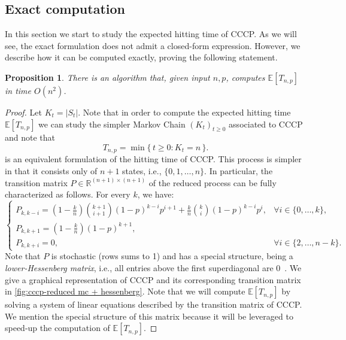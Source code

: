 \documentclass[11pt,a4paper]{article}
\newtheorem{proposition}[theorem]{Proposition}
\newcommand{\E}{\mathbb{E}}
\begin{document}
\subsection{Exact computation}\label{sec:algorithm}
In this section we start to study the expected hitting time of CCCP. As we will see, the exact formulation does not admit a closed-form expression. 
However, we describe how it can be computed exactly, proving the following statement.
\begin{proposition}
There is an algorithm that, given input $n,p$, computes $\E[T_{n,p}]$ in time $O(n^2)$.
\end{proposition}
\begin{proof}
Let $K_t = |S_t|$. Note that in order to compute the expected hitting time $\E[T_{n,p}]$ we can study the simpler Markov Chain $(K_t)_{t\ge 0}$ associated to CCCP and note that
\[
    T_{n,p} = \min\{\, t\ge 0 : K_t = n \,\}.
\]
is an equivalent formulation of the hitting time of CCCP.
This process is simpler in that it consists only of $n+1$ states, i.e., $\{0,1,\ldots,n\}$.
In particular, the transition matrix $P \in \mathbb{R}^{(n+1) \times (n+1)}$ of the reduced process can be fully characterized as follows. 
For every $k$, we have:
\[
\begin{cases}
    P_{k,k-i} = \left(1-\frac{k}{n}\right)\binom{k+1}{i+1}(1-p)^{k-i}p^{i+1} + \frac{k}{n} \binom{k}{i}(1-p)^{k-i}p^i, & \forall i \in \{0,\ldots,k\},
    \\
    P_{k,k+1} = \left(1-\frac{k}{n}\right)(1-p)^{k+1},&\\
    P_{k,k+i} = 0, & \forall i \in \{2,\ldots,n-k\}.
\end{cases}
\]
Note that $P$ is stochastic (rows sums to 1) and has a special structure, being a \textit{lower-Hessenberg matrix}, i.e., all entries above the first superdiagonal are 0~\cite{golub2013matrix}. 
We give a graphical representation of CCCP and its corresponding transition matrix in \cref{fig:cccp-reduced mc + hessenberg}. Note that we will compute $\E[T_{n,p}]$ by solving a system of linear equations described by the transition matrix of CCCP. We mention the special structure of this matrix because it will be leveraged to speed-up the computation of $\E[T_{n,p}]$.


\end{proof}
\end{document}
